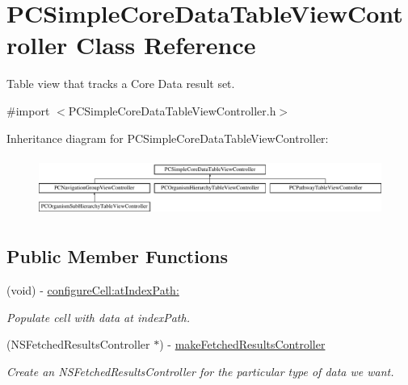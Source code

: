 \hypertarget{interface_p_c_simple_core_data_table_view_controller}{
\section{PCSimpleCoreDataTableViewController Class Reference}
\label{interface_p_c_simple_core_data_table_view_controller}
}


Table view that tracks a Core Data result set.  




{\ttfamily \#import $<$PCSimpleCoreDataTableViewController.h$>$}

Inheritance diagram for PCSimpleCoreDataTableViewController:\begin{figure}[h!]
\begin{center}
\leavevmode
\includegraphics[height=1.964912cm]{kegg_doc/interface_p_c_simple_core_data_table_view_controller}
\end{center}
\end{figure}
\subsection*{Public Member Functions}
\begin{DoxyCompactItemize}
\item 
\hypertarget{interface_p_c_simple_core_data_table_view_controller_a2f839995aff2bf95337371ae2e3ac8c7}{
(void) -\/ \hyperlink{interface_p_c_simple_core_data_table_view_controller_a2f839995aff2bf95337371ae2e3ac8c7}{configureCell:atIndexPath:}}
\label{interface_p_c_simple_core_data_table_view_controller_a2f839995aff2bf95337371ae2e3ac8c7}

\begin{DoxyCompactList}\small\item\em Populate cell with data at indexPath. \end{DoxyCompactList}\item 
\hypertarget{interface_p_c_simple_core_data_table_view_controller_abf2ebedf85853d131885b6e17eeef468}{
(NSFetchedResultsController $\ast$) -\/ \hyperlink{interface_p_c_simple_core_data_table_view_controller_abf2ebedf85853d131885b6e17eeef468}{makeFetchedResultsController}}
\label{interface_p_c_simple_core_data_table_view_controller_abf2ebedf85853d131885b6e17eeef468}

\begin{DoxyCompactList}\small\item\em Create an NSFetchedResultsController for the particular type of data we want. \end{DoxyCompactList}\end{DoxyCompactItemize}
